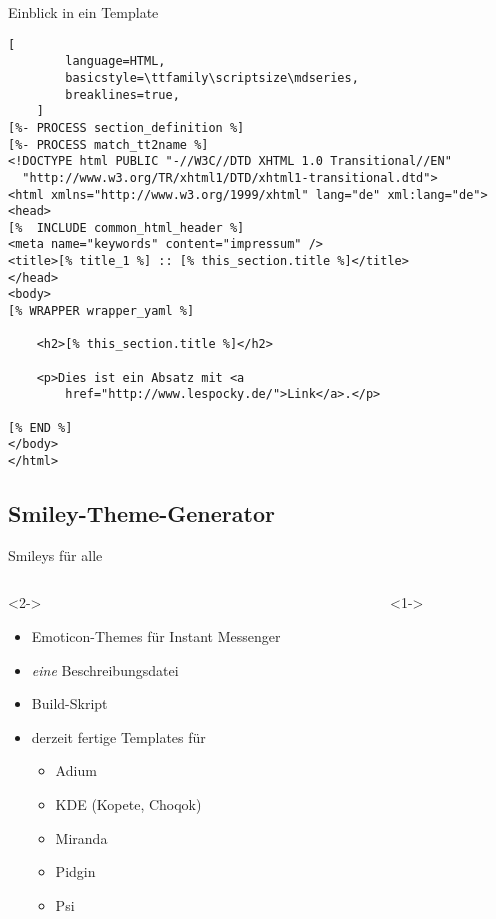 \documentclass[hyperref={pdfpagelabels=false}]{beamer}
\begin{document}
\begin{frame}[fragile]{Einblick in ein Template}
    \begin{lstlisting}[
        language=HTML,
        basicstyle=\ttfamily\scriptsize\mdseries,
        breaklines=true,
    ]
[%- PROCESS section_definition %]
[%- PROCESS match_tt2name %]
<!DOCTYPE html PUBLIC "-//W3C//DTD XHTML 1.0 Transitional//EN"
  "http://www.w3.org/TR/xhtml1/DTD/xhtml1-transitional.dtd">
<html xmlns="http://www.w3.org/1999/xhtml" lang="de" xml:lang="de">
<head>
[%  INCLUDE common_html_header %]
<meta name="keywords" content="impressum" />
<title>[% title_1 %] :: [% this_section.title %]</title>
</head>
<body>
[% WRAPPER wrapper_yaml %]

    <h2>[% this_section.title %]</h2>

    <p>Dies ist ein Absatz mit <a 
        href="http://www.lespocky.de/">Link</a>.</p>

[% END %]
</body>
</html>
    \end{lstlisting}
\end{frame}

\subsection{Smiley-Theme-Generator}

\begin{frame}{Smileys für alle}
    \begin{columns}
        \begin{column}{0.4\textwidth}<2->
            \begin{itemize}
                \item Emoticon-Themes für Instant Messenger
                \item \emph{eine} Beschreibungsdatei
                \item Build-Skript
                \item derzeit fertige Templates für
                    \begin{itemize}
                        \item Adium
                        \item KDE (Kopete, Choqok)
                        \item Miranda
                        \item Pidgin
                        \item Psi
                    \end{itemize}
            \end{itemize}
        \end{column}
        \begin{column}{0.6\textwidth}<1->
            \begin{centering}
            \end{centering}
        \end{column}
    \end{columns}
\end{frame}
\end{document}
